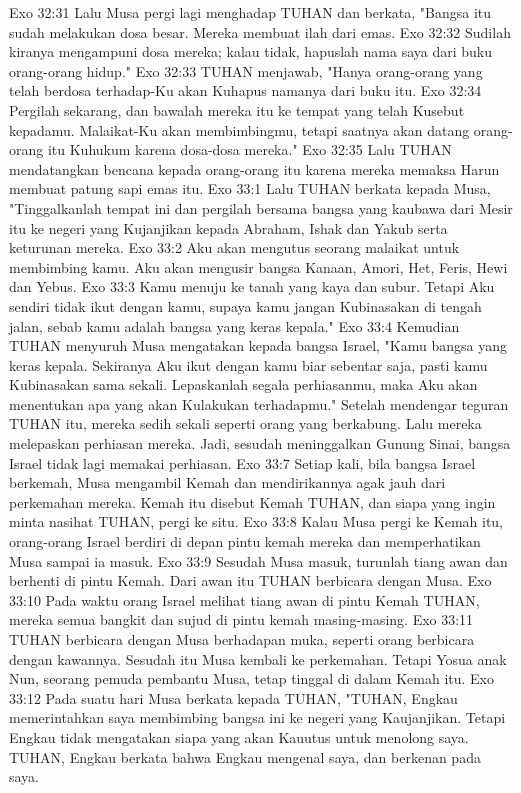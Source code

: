 Exo 32:31  Lalu Musa pergi lagi menghadap TUHAN dan berkata, "Bangsa itu sudah melakukan dosa besar. Mereka membuat ilah dari emas.
Exo 32:32  Sudilah kiranya mengampuni dosa mereka; kalau tidak, hapuslah nama saya dari buku orang-orang hidup."
Exo 32:33  TUHAN menjawab, "Hanya orang-orang yang telah berdosa terhadap-Ku akan Kuhapus namanya dari buku itu.
Exo 32:34  Pergilah sekarang, dan bawalah mereka itu ke tempat yang telah Kusebut kepadamu. Malaikat-Ku akan membimbingmu, tetapi saatnya akan datang orang-orang itu Kuhukum karena dosa-dosa mereka."
Exo 32:35  Lalu TUHAN mendatangkan bencana kepada orang-orang itu karena mereka memaksa Harun membuat patung sapi emas itu.
Exo 33:1  Lalu TUHAN berkata kepada Musa, "Tinggalkanlah tempat ini dan pergilah bersama bangsa yang kaubawa dari Mesir itu ke negeri yang Kujanjikan kepada Abraham, Ishak dan Yakub serta keturunan mereka.
Exo 33:2  Aku akan mengutus seorang malaikat untuk membimbing kamu. Aku akan mengusir bangsa Kanaan, Amori, Het, Feris, Hewi dan Yebus.
Exo 33:3  Kamu menuju ke tanah yang kaya dan subur. Tetapi Aku sendiri tidak ikut dengan kamu, supaya kamu jangan Kubinasakan di tengah jalan, sebab kamu adalah bangsa yang keras kepala."
Exo 33:4  Kemudian TUHAN menyuruh Musa mengatakan kepada bangsa Israel, "Kamu bangsa yang keras kepala. Sekiranya Aku ikut dengan kamu biar sebentar saja, pasti kamu Kubinasakan sama sekali. Lepaskanlah segala perhiasanmu, maka Aku akan menentukan apa yang akan Kulakukan terhadapmu." Setelah mendengar teguran TUHAN itu, mereka sedih sekali seperti orang yang berkabung. Lalu mereka melepaskan perhiasan mereka. Jadi, sesudah meninggalkan Gunung Sinai, bangsa Israel tidak lagi memakai perhiasan.
Exo 33:7  Setiap kali, bila bangsa Israel berkemah, Musa mengambil Kemah dan mendirikannya agak jauh dari perkemahan mereka. Kemah itu disebut Kemah TUHAN, dan siapa yang ingin minta nasihat TUHAN, pergi ke situ.
Exo 33:8  Kalau Musa pergi ke Kemah itu, orang-orang Israel berdiri di depan pintu kemah mereka dan memperhatikan Musa sampai ia masuk.
Exo 33:9  Sesudah Musa masuk, turunlah tiang awan dan berhenti di pintu Kemah. Dari awan itu TUHAN berbicara dengan Musa.
Exo 33:10  Pada waktu orang Israel melihat tiang awan di pintu Kemah TUHAN, mereka semua bangkit dan sujud di pintu kemah masing-masing.
Exo 33:11  TUHAN berbicara dengan Musa berhadapan muka, seperti orang berbicara dengan kawannya. Sesudah itu Musa kembali ke perkemahan. Tetapi Yosua anak Nun, seorang pemuda pembantu Musa, tetap tinggal di dalam Kemah itu.
Exo 33:12  Pada suatu hari Musa berkata kepada TUHAN, "TUHAN, Engkau memerintahkan saya membimbing bangsa ini ke negeri yang Kaujanjikan. Tetapi Engkau tidak mengatakan siapa yang akan Kauutus untuk menolong saya. TUHAN, Engkau berkata bahwa Engkau mengenal saya, dan berkenan pada saya.
